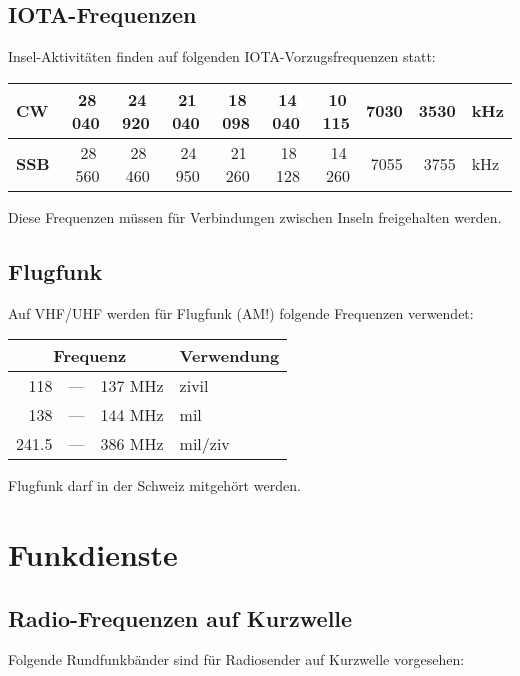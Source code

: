 \subsection{IOTA-Frequenzen}
Insel-Aktivitäten finden auf folgenden IOTA-Vorzugsfrequenzen statt:

\vspace{1em}
\begin{tabular}{lrrrrrrrrl}
\bfseries CW & 28 040 & 24 920 & 21 040 & 18 098 & 14 040 & 10 115 & 7030 & 3530 & kHz \\ \toprule
\bfseries SSB & 28 560 & 28 460 & 24 950 & 21 260 & 18 128 & 14 260 & 7055 & 3755 & kHz
\end{tabular}
\vspace{1em}

Diese Frequenzen müssen für Verbindungen zwischen Inseln freigehalten werden.

\subsection{Flugfunk}
Auf VHF/UHF werden für Flugfunk (AM!) folgende Frequenzen verwendet:

\vspace{1em}
\begin{tabular}{rcll}
\multicolumn{3}{c}{\textbf{Frequenz}} & \textbf{Verwendung} \\ \toprule \arrayrulecolor{rowsep}
118 & — & 137 MHz & zivil \\ \midrule
138 & — & 144 MHz & mil \\ \midrule
241.5 & — & 386 MHz & mil/ziv \\ \midrule
\end{tabular}
\vspace{1em}

Flugfunk darf in der Schweiz mitgehört werden.

\section{Funkdienste}
\subsection{Radio-Frequenzen auf Kurzwelle}
Folgende Rundfunkbänder sind für Radiosender auf Kurzwelle vorgesehen:

